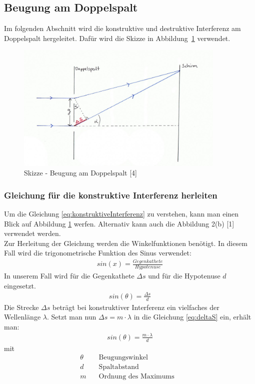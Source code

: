 \documentclass[a4paper]{scrartcl}
\numberwithin{equation}{subsection}
\begin{document}
\subsection{Beugung am Doppelspalt}
Im folgenden Abschnitt wird die konstruktive und destruktive Interferenz am Doppelspalt hergeleitet. Dafür wird die Skizze in Abbildung~\ref{fig:skizzeDoppelspalt} verwendet.

\begin{figure}[H]
\includegraphics[width=10cm]{Skizze_Doppelspalt}
\centering
\caption{Skizze - Beugung am Doppelspalt [4]}
\centering
\label{fig:skizzeDoppelspalt}
\end{figure}

\subsubsection{Gleichung für die konstruktive Interferenz herleiten}
Um die Gleichung \ref{eq:konstruktiveInterferenz} zu verstehen, kann man einen Blick auf Abbildung \ref{fig:skizzeDoppelspalt} werfen. Alternativ kann auch die Abbildung 2(b) [1] verwendet werden.\\
Zur Herleitung der Gleichung werden die Winkelfunktionen benötigt. In diesem Fall wird die trigonometrische Funktion des Sinus verwendet:
\begin{align}
sin(x)=\frac{Gegenkathete}{Hypotenuse}
\end{align}
In unserem Fall wird für die Gegenkathete $\Delta s$ und für die Hypotenuse $d$ eingesetzt.
\begin{align}
\label{eq:deltaS}
sin(\theta)=\frac{\Delta s}{d}
\end{align}
Die Strecke $\Delta s$ beträgt bei konstruktiver Interferenz ein vielfaches der Wellenlänge $\lambda$. Setzt man nun $\Delta s = m \cdot \lambda$ in die Gleichung \ref{eq:deltaS} ein, erhält man:
\begin{align}
\label{eq:konstruktiveInterferenz}
sin(\theta)=\frac{m \cdot \lambda}{d}
\end{align}
mit
\begin{align*}
\theta \quad &\text{Beugungswinkel}&\\
d \quad &\text{Spaltabstand}&\\
m \quad &\text{Ordnung des Maximums}&\\
\end{align*}
\end{document}
